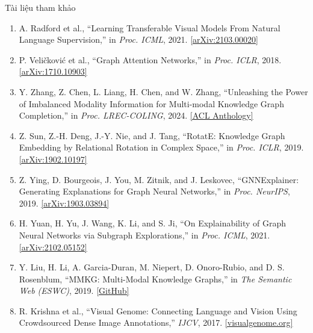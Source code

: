\documentclass[aspectratio=169,10pt]{beamer}
\newif\ifbackupslides
\newcounter{backupslide}
\begin{document}
\begin{frame}{Tài liệu tham khảo}
  \footnotesize
  \begin{enumerate}
    \setlength{\itemsep}{3.5pt}
    \item A. Radford et al., ``Learning Transferable Visual Models From Natural Language Supervision,'' in \textit{Proc. ICML}, 2021. \href{https://arxiv.org/abs/2103.00020}{\color{HCMUSBlue}[arXiv:2103.00020]}
    \item P. Veli\v{c}kovi\'{c} et al., ``Graph Attention Networks,'' in \textit{Proc. ICLR}, 2018. \href{https://arxiv.org/abs/1710.10903}{\color{HCMUSBlue}[arXiv:1710.10903]}
    \item Y. Zhang, Z. Chen, L. Liang, H. Chen, and W. Zhang, ``Unleashing the Power of Imbalanced Modality Information for Multi-modal Knowledge Graph Completion,'' in \textit{Proc. LREC-COLING}, 2024. \href{https://aclanthology.org/2024.lrec-main.1487/}{\color{HCMUSBlue}[ACL Anthology]}
    \item Z. Sun, Z.-H. Deng, J.-Y. Nie, and J. Tang, ``RotatE: Knowledge Graph Embedding by Relational Rotation in Complex Space,'' in \textit{Proc. ICLR}, 2019. \href{https://arxiv.org/abs/1902.10197}{\color{HCMUSBlue}[arXiv:1902.10197]}
    \item Z. Ying, D. Bourgeois, J. You, M. Zitnik, and J. Leskovec, ``GNNExplainer: Generating Explanations for Graph Neural Networks,'' in \textit{Proc. NeurIPS}, 2019. \href{https://arxiv.org/abs/1903.03894}{\color{HCMUSBlue}[arXiv:1903.03894]}
    \item H. Yuan, H. Yu, J. Wang, K. Li, and S. Ji, ``On Explainability of Graph Neural Networks via Subgraph Explorations,'' in \textit{Proc. ICML}, 2021. \href{https://arxiv.org/abs/2102.05152}{\color{HCMUSBlue}[arXiv:2102.05152]}
    \item Y. Liu, H. Li, A. Garcia-Duran, M. Niepert, D. Onoro-Rubio, and D. S. Rosenblum, ``MMKG: Multi-Modal Knowledge Graphs,'' in \textit{The Semantic Web (ESWC)}, 2019. \href{https://github.com/nle-ml/mmkg}{\color{HCMUSBlue}[GitHub]}
    \item R. Krishna et al., ``Visual Genome: Connecting Language and Vision Using Crowdsourced Dense Image Annotations,'' \textit{IJCV}, 2017. \href{https://visualgenome.org/}{\color{HCMUSBlue}[visualgenome.org]}
  \end{enumerate}
\end{frame}

\appendix
\backupslidestrue
\end{document}
